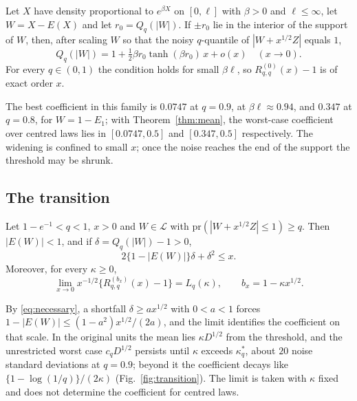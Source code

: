 \documentclass[lineno]{biometrika}
\newcommand{\pr}{\mathrm{pr}}
\newcommand{\LC}{\mathcal{L}}
\begin{document}
\begin{proposition}\label{prop:centred}
Let $X$ have density proportional to $e^{\beta X}$ on $[0, \ell]$ with $\beta > 0$ and $\ell \le \infty$, let $W = X - E(X)$ and let $r_0 = Q_q(|W|)$. If $\pm r_0$ lie in the interior of the support of $W$, then, after scaling $W$ so that the noisy $q$-quantile of $|W + x^{1/2}Z|$ equals $1$,
\[
Q_q(|W|) = 1 + \tfrac{1}{2}\beta r_0\tanh(\beta r_0)\,x + o(x) \quad (x \to 0).
\]
For every $q \in (0,1)$ the condition holds for small $\beta\ell$, so $R^{(0)}_{q,q}(x) - 1$ is of exact order $x$.
\end{proposition}

The best coefficient in this family is $0.0747$ at $q = 0.9$, at $\beta\ell \approx 0.94$, and $0.347$ at $q = 0.8$, for $W = 1 - E_1$; with Theorem~\ref{thm:mean}, the worst-case coefficient over centred laws lies in $[0.0747, 0.5]$ and $[0.347, 0.5]$ respectively. The widening is confined to small $x$; once the noise reaches the end of the support the threshold may be shrunk.

\subsection{The transition}

\begin{theorem}\label{thm:transition}
Let $1 - e^{-1} < q < 1$, $x > 0$ and $W \in \LC$ with $\pr(|W + x^{1/2}Z| \le 1) \ge q$. Then $|E(W)| < 1$, and if $\delta = Q_q(|W|) - 1 > 0$,
\begin{equation}\label{eq:necessary}
2\{1 - |E(W)|\}\delta + \delta^2 \le x .
\end{equation}
Moreover, for every $\kappa \ge 0$,
\[
\lim_{x \to 0} x^{-1/2}\{R^{(b_x)}_{q,q}(x) - 1\} = L_q(\kappa), \qquad b_x = 1 - \kappa x^{1/2}.
\]
\end{theorem}

By \eqref{eq:necessary}, a shortfall $\delta \ge a x^{1/2}$ with $0 < a < 1$ forces $1 - |E(W)| \le (1 - a^2)x^{1/2}/(2a)$, and the limit identifies the coefficient on that scale. In the original units the mean lies $\kappa D^{1/2}$ from the threshold, and the unrestricted worst case $c_q D^{1/2}$ persists until $\kappa$ exceeds $\kappa^*_q$, about $20$ noise standard deviations at $q = 0.9$; beyond it the coefficient decays like $\{1 - \log(1/q)\}/(2\kappa)$ (Fig.~\ref{fig:transition}). The limit is taken with $\kappa$ fixed and does not determine the coefficient for centred laws.
\end{document}
